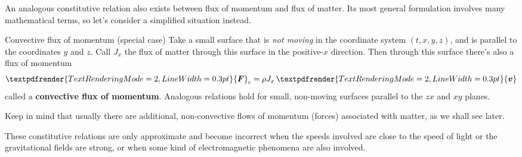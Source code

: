\documentclass[a4paper,12pt,%
onecolumn,oneside,titlepage,%
british%
]{memoir}
\renewcommand*{\bm}[1]{\textpdfrender{TextRenderingMode=2,LineWidth=0.3pt}{\boldsymbol{#1}}}
\renewcommand*{\|}[1][]{\nonscript\:#1\vert\nonscript\:\mathopen{}}
\newcommand*{\yv}{\bm{v}}
\newcommand*{\yN}{N}
\newcommand*{\yJ}{J}
\newcommand*{\yrho}{\rho}
\newcommand*{\yM}{M}%
\newcommand*{\yF}{\bm{F}}
\begin{document}
An analogous constitutive relation also exists between flux of momentum and flux of matter. Its most general formulation involves many mathematical terms, so let's consider a simplified situation instead.
\begin{definition}{Convective flux of momentum (special case)}
  Take a small surface that is \emph{not moving} in the coordinate system $(t,x,y,z)$, and is parallel to the coordinates $y$ and $z$. Call $\yJ_{x}$ the flux of matter through this surface in the positive-$x$ direction. Then through this surface there's also a flux of momentum
  \begin{equation}
    \label{eq:matterflux_force_Newton}
    \yF_{\text{c}} = \yrho\yJ_{x}\,\yv
  \end{equation}
  called a \textbf{convective flux of momentum}. Analogous relations hold for small, non-moving surfaces parallel to the $zx$ and $xy$ planes.
\end{definition}
\begin{warning}
  Keep in mind that usually there are additional, non-convective flows of momentum (forces) associated with matter, as we shall see later.
\end{warning}

These constitutive relations are only approximate and become incorrect when the speeds involved are close to the speed of light or the gravitational fields are strong, or when some kind of electromagnetic phenomena are also involved.
\end{document}
